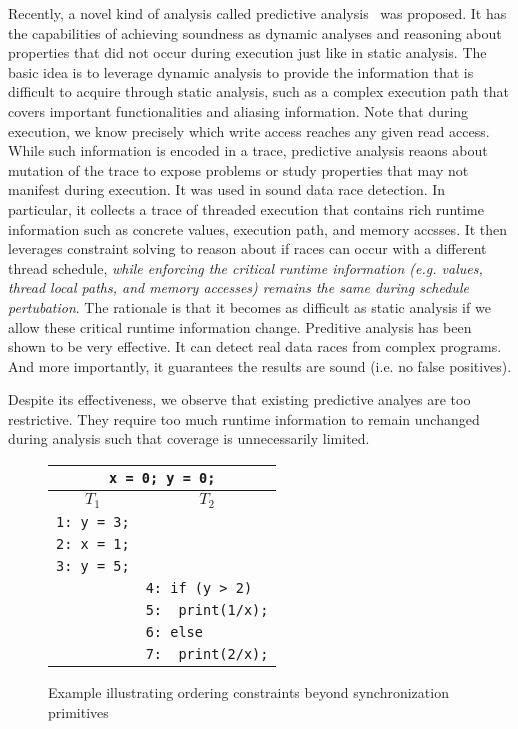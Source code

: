 Recently, a novel kind of analysis called predictive analysis~\cite{...} was proposed. It has the capabilities of 
achieving soundness as dynamic analyses and reasoning about properties that did not occur during execution 
just like in static analysis. The basic idea is to leverage dynamic analysis to provide the information that 
is difficult to acquire through static analysis, such as a complex execution path that covers important functionalities 
and aliasing information. Note that during execution, we know precisely which write access reaches any given read 
access. While such information is encoded in a trace, predictive analysis reaons about mutation of the trace to 
expose problems or study properties that may not manifest during execution. It was used in sound data race detection. 
In particular, it collects a trace of threaded execution that contains rich runtime information such as concrete values, 
execution path, and memory accsses. It then leverages constraint solving to reason about if races can occur with
a different thread schedule, {\em while enforcing the critical runtime information (e.g. values, thread
local paths, and memory accesses) remains the same during schedule pertubation}. The rationale is that 
it becomes as difficult as static analysis if we allow these critical runtime information change. 
Preditive analysis has been shown to be very effective. It can detect real data races from complex programs.
And more importantly, it guarantees the results are sound (i.e. no false positives).

Despite its effectiveness, we observe that existing predictive analyes are too restrictive. They 
require too much runtime information to remain unchanged during analysis such that coverage is unnecessarily
limited. 


\begin{figure}
\centering
\begin{tabular}{ll}
\multicolumn{2}{c}{{\tt x = 0; y = 0;}} \\  %
\hline
\multicolumn{1}{c}{$T_1$} & \multicolumn{1}{c}{$T_2$} \\
\hline
{\tt 1: y = 3;} & \\
{\tt 2: x = 1;} & \\
{\tt 3: y = 5;} & \\
& {\tt 4: if (y > 2)} \\
& {\tt 5:~~print(1/x);} \\	
& {\color{red} {\tt 6: else}} \\
& {\color{red} {\tt 7:~~print(2/x);}}
\end{tabular}
\caption{Example illustrating ordering constraints beyond synchronization primitives}
\label{fig:running}
\end{figure}

